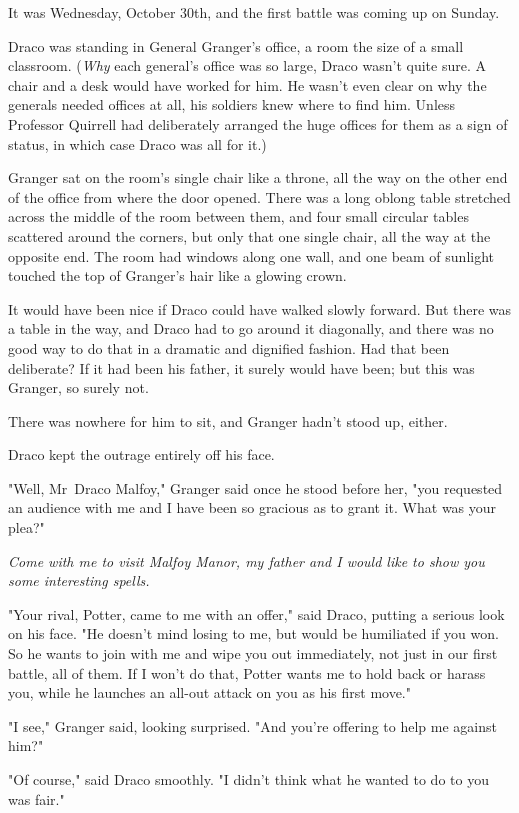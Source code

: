 It was Wednesday, October 30th, and the first battle was coming up on Sunday.

Draco was standing in General Granger's office, a room the size of a small
classroom. (\emph{Why} each general's office was so large, Draco wasn't quite
sure. A chair and a desk would have worked for him. He wasn't even clear on why
the generals needed offices at all, his soldiers knew where to find him. Unless
Professor Quirrell had deliberately arranged the huge offices for them as a
sign of status, in which case Draco was all for it.)

Granger sat on the room's single chair like a throne, all the way on the other
end of the office from where the door opened. There was a long oblong table
stretched across the middle of the room between them, and four small circular
tables scattered around the corners, but only that one single chair, all the
way at the opposite end. The room had windows along one wall, and one beam of
sunlight touched the top of Granger's hair like a glowing crown.

It would have been nice if Draco could have walked slowly forward. But there
was a table in the way, and Draco had to go around it diagonally, and there was
no good way to do that in a dramatic and dignified fashion. Had that been
deliberate? If it had been his father, it surely would have been; but this was
Granger, so surely not.

There was nowhere for him to sit, and Granger hadn't stood up, either.

Draco kept the outrage entirely off his face.

"Well, Mr~Draco Malfoy," Granger said once he stood before her, "you requested
an audience with me and I have been so gracious as to grant it. What was your
plea?"

\emph{Come with me to visit Malfoy Manor, my father and I would like to show
you some interesting spells.}

"Your rival, Potter, came to me with an offer," said Draco, putting a serious
look on his face. "He doesn't mind losing to me, but would be humiliated if you
won. So he wants to join with me and wipe you out immediately, not just in our
first battle, all of them. If I won't do that, Potter wants me to hold back or
harass you, while he launches an all-out attack on you as his first move."

"I see," Granger said, looking surprised. "And you're offering to help me
against him?"

"Of course," said Draco smoothly. "I didn't think what he wanted to do to you
was fair."

